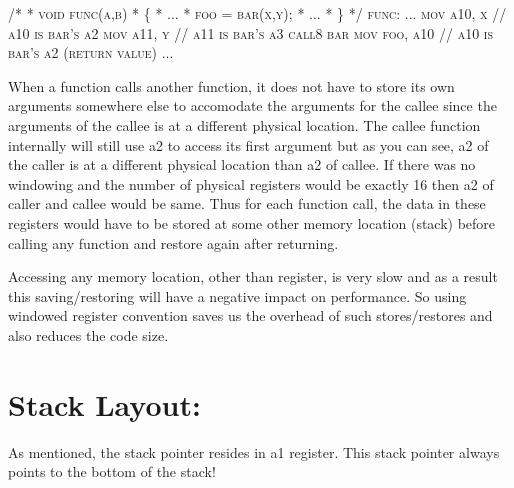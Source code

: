 \begin{tcolorbox}
\textsc{    /*\newline}
\textsc{	* void func(a,b)\newline}
\textsc{	* \{\newline}
\textsc{		*     ...\newline}
\textsc{		*     foo = bar(x,y);\newline}
\textsc{		*     ...\newline}
\textsc{		* \}\newline}
\textsc{	*/	\newline}
\textsc{		func:\newline}
\textsc{		...\newline}
\textsc{		mov         a10, x    // a10 is bar’s a2\newline}
\textsc{		mov         a11, y    // a11 is bar’s a3\newline}
\textsc{		call8       bar	\newline}
\textsc{		mov         foo, a10  // a10 is bar’s a2 (return value)\newline}
\textsc{		...}
\end{tcolorbox}

 When a function calls another function, it does not have to store its own arguments somewhere else to accomodate the arguments for the callee since the arguments of the callee is at a different physical location. The callee function internally will still use a2 to access its first argument but as you can see, a2 of the caller is at a different physical location than a2 of callee. If there was no windowing and the number of physical registers would be exactly 16 then a2 of caller and callee would be same. Thus for each function call, the data in these registers would have to be stored at some other memory location (stack) before calling any function and restore again after returning.

Accessing any memory location, other than register, is very slow and as a result this saving/restoring will have a negative impact on performance. So using windowed register convention saves us the overhead of such stores/restores and also reduces the code size.

\section*{Stack Layout:}
As mentioned, the stack pointer resides in a1 register. This stack pointer always points to the bottom of the stack!

